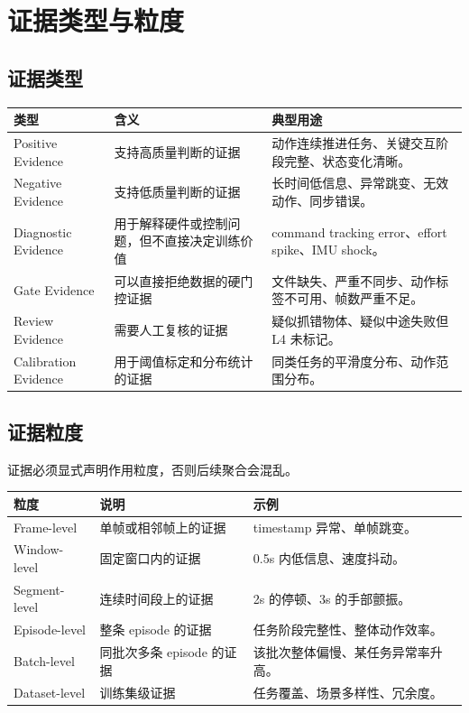\documentclass[UTF8,zihao=-4]{ctexart}
\begin{document}
\section{证据类型与粒度}

\subsection{证据类型}

\begin{longtable}{L{3cm} L{4.2cm} L{6.4cm}}
\toprule
类型 & 含义 & 典型用途 \\
\midrule
Positive Evidence & 支持高质量判断的证据 & 动作连续推进任务、关键交互阶段完整、状态变化清晰。 \\
Negative Evidence & 支持低质量判断的证据 & 长时间低信息、异常跳变、无效动作、同步错误。 \\
Diagnostic Evidence & 用于解释硬件或控制问题，但不直接决定训练价值 & command tracking error、effort spike、IMU shock。 \\
Gate Evidence & 可以直接拒绝数据的硬门控证据 & 文件缺失、严重不同步、动作标签不可用、帧数严重不足。 \\
Review Evidence & 需要人工复核的证据 & 疑似抓错物体、疑似中途失败但 L4 未标记。 \\
Calibration Evidence & 用于阈值标定和分布统计的证据 & 同类任务的平滑度分布、动作范围分布。 \\
\bottomrule
\end{longtable}

\subsection{证据粒度}

证据必须显式声明作用粒度，否则后续聚合会混乱。

\begin{longtable}{L{3cm} L{4.3cm} L{6.3cm}}
\toprule
粒度 & 说明 & 示例 \\
\midrule
Frame-level & 单帧或相邻帧上的证据 & timestamp 异常、单帧跳变。 \\
Window-level & 固定窗口内的证据 & 0.5s 内低信息、速度抖动。 \\
Segment-level & 连续时间段上的证据 & 2s 的停顿、3s 的手部颤振。 \\
Episode-level & 整条 episode 的证据 & 任务阶段完整性、整体动作效率。 \\
Batch-level & 同批次多条 episode 的证据 & 该批次整体偏慢、某任务异常率升高。 \\
Dataset-level & 训练集级证据 & 任务覆盖、场景多样性、冗余度。 \\
\bottomrule
\end{longtable}
\end{document}
